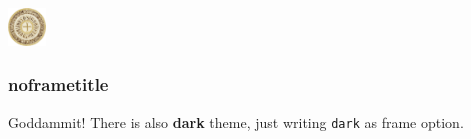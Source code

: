 \documentclass[aspectratio=169]{beamer}
\begin{document}




\begin{frame}[plain,dark,backgroundpicture=fig/scq_alameda,overlaytitlepage=0.9]
  \begin{minipage}[b][\textheight][b]{5cm}
    \includegraphics[height=1cm]{logos/alfonsoX_signum_reg}
  \end{minipage}
\end{frame}

\addtocounter{framenumber}{+1}
\begin{frame}[plain,dark,backgroundpicture=fig/scq_alameda,overlaytoc=0.9]
  \addtocounter{framenumber}{-1}
  \hspace*{7.3cm}\begin{minipage}{8cm}
    \tableofcontents
  \end{minipage}
\end{frame}





\begin{frame}
\frametitle{noframetitle}

\Large \centering Goddammit! There is also \textbf{dark} theme, just writing \texttt{dark}
as frame option.

\end{frame}





\end{document}
